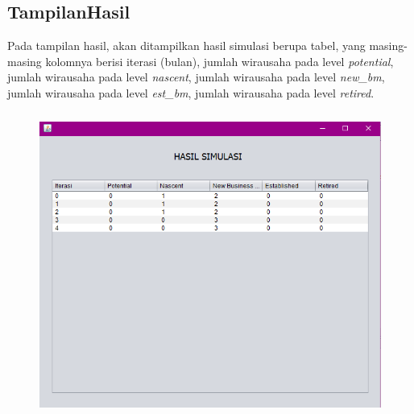 \subsection{TampilanHasil}

Pada tampilan hasil, akan ditampilkan hasil simulasi berupa tabel, yang masing-masing kolomnya berisi iterasi (bulan), jumlah wirausaha pada level \textit{potential}, jumlah wirausaha pada level \textit{nascent}, jumlah wirausaha pada level \textit{new\_bm}, jumlah wirausaha pada level \textit{est\_bm}, jumlah wirausaha pada level \textit{retired}.
\begin{figure} [H]
	\centering  
	\includegraphics[width=12cm, height=10cm]{hasil1} 
	\label{fig:tampilanHasil} 
\end{figure}

